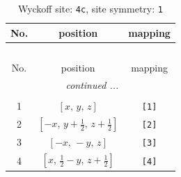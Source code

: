 \documentclass[fleqn,8pt]{jsarticle}
\begin{document}
\renewcommand{\arraystretch}{1.2}
\begin{longtable}{ccc}
\caption{Wyckoff site: {\tt 4c}, site symmetry: {\tt 1}}
 \\
 \hline \hline
No. & position & mapping \\ \hline \endfirsthead

\multicolumn{2}{l}{\tablename\ \thetable{}} \\
 \hline \hline
No. & position & mapping \\ \hline \endhead

 \hline \hline
\multicolumn{2}{r}{\footnotesize\it continued ...} \\ \endfoot

 \hline \hline
\multicolumn{2}{r}{} \\ \endlastfoot

1 & $\left[ x,\, y,\, z \right]$ & {\tt [1]} \\ \hline
2 & $\left[ - x,\, y + \frac{1}{2},\, z + \frac{1}{2} \right]$ & {\tt [2]} \\ \hline
3 & $\left[ - x,\, - y,\, z \right]$ & {\tt [3]} \\ \hline
4 & $\left[ x,\, \frac{1}{2} - y,\, z + \frac{1}{2} \right]$ & {\tt [4]} \\
\end{longtable}
\end{document}

